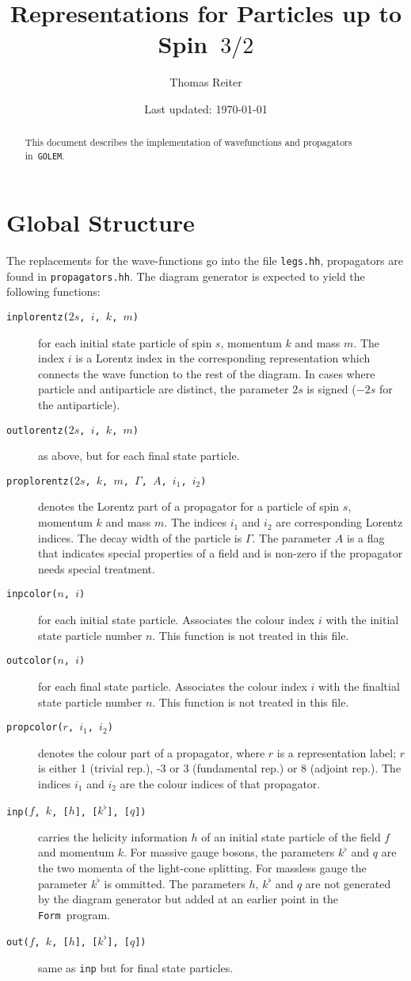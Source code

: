 \documentclass[a4paper,12pt]{amsart}
\date{Last updated: \today}
\author{Thomas Reiter}
\title{Representations for Particles up to Spin~$3/2$}
\newcommand{\form}{{\texttt{Form}}}
\newcommand{\golem}{{\texttt{GOLEM}}}
\begin{document}
\begin{abstract}
This document describes the implementation of wavefunctions and
propagators in~\golem.
\end{abstract}
\maketitle
\tableofcontents
\section{Global Structure}
The replacements for the wave-functions go into the file \texttt{legs.hh},
propagators are found in \texttt{propagators.hh}. The diagram generator is
expected to yield the following functions:
\begin{description}
\item[\texttt{inplorentz($2s$, $i$, $k$, $m$)}] for each initial state
particle of spin $s$, momentum $k$ and mass $m$. The index $i$ is a
Lorentz index in the corresponding representation which connects the
wave function to the rest of the diagram. In cases where particle and
antiparticle are distinct, the parameter $2s$ is signed ($-2s$ for the
antiparticle).
\item[\texttt{outlorentz($2s$, $i$, $k$, $m$)}] as above,
but for each final state particle.
\item[\texttt{proplorentz($2s$, $k$, $m$, $\Gamma$, $A$, $i_1$, $i_2$)}]
denotes the
Lorentz part of a propagator for a particle of spin $s$, momentum $k$ and
mass $m$. The indices $i_1$ and $i_2$ are corresponding Lorentz indices.
The decay width of the particle is $\Gamma$. The parameter $A$ is a flag
that indicates special properties of a field and is non-zero if the
propagator needs special treatment.
\item[\texttt{inpcolor($n$, $i$)}] for each initial state particle.
Associates the colour index $i$ with the initial state particle number $n$.
This function is not treated in this file.
\item[\texttt{outcolor($n$, $i$)}] for each final state particle.
Associates the colour index $i$ with the finaltial state particle number $n$.
This function is not treated in this file.
\item[\texttt{propcolor($r$, $i_1$, $i_2$)}] denotes the colour part of
a propagator, where $r$ is a representation label; $r$ is
either 1 (trivial rep.), -3 or 3 (fundamental rep.) or 8 (adjoint rep.).
The indices $i_1$ and $i_2$ are the colour indices of that propagator.
\item[\texttt{inp($f$, $k$, [$h$], [$k^\flat$], [$q$])}]
carries the helicity information
$h$ of an initial state particle of the field $f$ and momentum $k$.
For massive gauge
bosons, the parameters $k^\flat$ and $q$ are the two momenta of the
light-cone splitting. For massless gauge the parameter $k^\flat$ is
ommitted.
The parameters $h$, $k^\flat$ and $q$ are not generated
by the diagram generator but added at an earlier point
in the \form\ program.
\item[\texttt{out($f$, $k$, [$h$], [$k^\flat$], [$q$])}]
same as \texttt{inp} but for final state particles.
\end{description}
\end{document}
